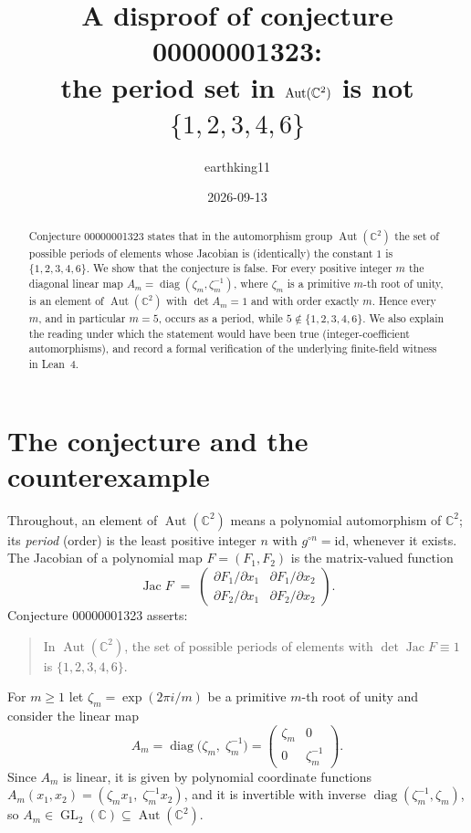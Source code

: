 \documentclass[11pt]{article}
\title{A disproof of conjecture 00000001323:\\ the period set in $\Aut(\C^2)$ is not $\{1,2,3,4,6\}$}
\author{earthking11}
\date{2026-09-13}
\theoremstyle{remark}
\newcommand{\Aut}{\operatorname{Aut}}
\newcommand{\GL}{\operatorname{GL}}
\newcommand{\Jac}{\operatorname{Jac}}
\newcommand{\diag}{\operatorname{diag}}
\newcommand{\C}{\mathbb{C}}
\begin{document}
\maketitle

\begin{abstract}
Conjecture 00000001323 states that in the automorphism group $\Aut(\C^2)$ the
set of possible periods of elements whose Jacobian is (identically) the constant
$1$ is $\{1,2,3,4,6\}$. We show that the conjecture is false. For every positive
integer $m$ the diagonal linear map
$A_m=\diag(\zeta_m,\zeta_m^{-1})$, where $\zeta_m$ is a primitive $m$-th root of
unity, is an element of $\Aut(\C^2)$ with $\det A_m=1$ and with order exactly
$m$. Hence every $m$, and in particular $m=5$, occurs as a period, while
$5\notin\{1,2,3,4,6\}$. We also explain the reading under which the statement
would have been true (integer-coefficient automorphisms), and record a formal
verification of the underlying finite-field witness in Lean~4.
\end{abstract}

\section{The conjecture and the counterexample}

Throughout, an element of $\Aut(\C^2)$ means a polynomial automorphism of
$\C^2$; its \emph{period} (order) is the least positive integer $n$ with
$g^{\circ n}=\mathrm{id}$, whenever it exists. The Jacobian of a polynomial map
$F=(F_1,F_2)$ is the matrix-valued function
\[
  \Jac F \;=\;
  \begin{pmatrix}
    \partial F_1/\partial x_1 & \partial F_1/\partial x_2\\
    \partial F_2/\partial x_1 & \partial F_2/\partial x_2
  \end{pmatrix}.
\]
Conjecture 00000001323 asserts:
\begin{quote}
In $\Aut(\C^2)$, the set of possible periods of elements with
$\det \Jac F\equiv 1$ is $\{1,2,3,4,6\}$.
\end{quote}

For $m\ge 1$ let $\zeta_m=\exp(2\pi i/m)$ be a primitive $m$-th root of unity
and consider the linear map
\begin{equation}\label{eq:witness}
  A_m=\diag\bigl(\zeta_m,\;\zeta_m^{-1}\bigr)
  =\begin{pmatrix}\zeta_m&0\\0&\zeta_m^{-1}\end{pmatrix}.
\end{equation}
Since $A_m$ is linear, it is given by polynomial coordinate functions
$A_m(x_1,x_2)=(\zeta_m x_1,\;\zeta_m^{-1}x_2)$, and it is invertible with inverse
$\diag(\zeta_m^{-1},\zeta_m)$, so $A_m\in\GL_2(\C)\subseteq\Aut(\C^2)$.
\end{document}
